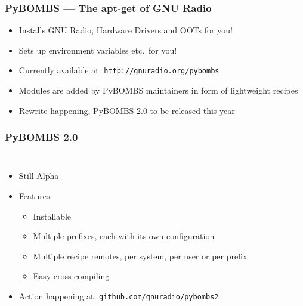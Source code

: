 \documentclass{beamer}
\begin{document}
\begin{frame}
  \frametitle{PyBOMBS --- The apt-get of GNU Radio}
  \begin{itemize}
    \item Installs GNU Radio, Hardware Drivers and OOTs for you!
    \item Sets up environment variables etc.\ for you!
    \item Currently available at: \texttt{http://gnuradio.org/pybombs}
    \item Modules are added by PyBOMBS maintainers in form of lightweight recipes
    \item Rewrite happening, PyBOMBS 2.0 to be released this year
  \end{itemize}
\end{frame}

\begin{frame}
  \frametitle{PyBOMBS 2.0}

  \begin{columns}[c]
    \column[T]{9cm}

  \begin{itemize}
    \item Still Alpha
    \item Features:
      \begin{itemize}
        \item Installable
        \item Multiple prefixes, each with its own configuration
        \item Multiple recipe remotes, per system, per user or per prefix
        \item Easy cross-compiling
      \end{itemize}
    \item Action happening at: \texttt{github.com/gnuradio/pybombs2}
  \end{itemize}

    \column[T]{2cm}


\end{columns}
\end{frame}
\end{document}

